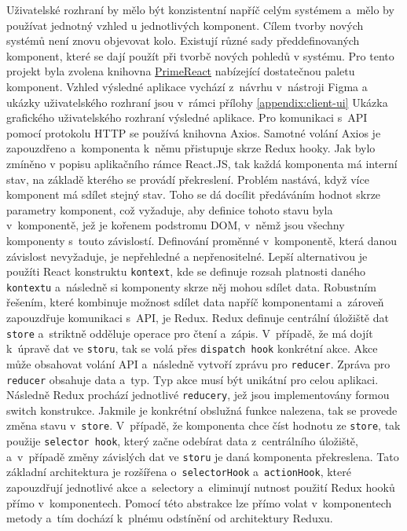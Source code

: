 \newpara
Uživatelské rozhraní by mělo být konzistentní napříč celým systémem a~mělo by používat jednotný vzhled u jednotlivých komponent. Cílem tvorby nových systémů není znovu objevovat kolo. Existují různé sady předdefinovaných komponent, které se dají použít při tvorbě nových pohledů v systému. Pro tento projekt byla zvolena knihovna \href{https://primereact.org/}{PrimeReact} nabízející dostatečnou paletu komponent. Vzhled výsledné aplikace vychází z~návrhu v~nástroji Figma a ukázky uživatelského rozhraní jsou v~rámci přílohy \ref{appendix:client-ui} Ukázka grafického uživatelského rozhraní výsledné aplikace.
\newpara
Pro komunikaci s~API pomocí protokolu HTTP se používá knihovna Axios. Samotné volání Axios je zapouzdřeno a~komponenta k~němu přistupuje skrze Redux hooky. Jak bylo zmíněno v popisu aplikačního rámce React.JS, tak každá komponenta má interní stav, na základě kterého se provádí překreslení. Problém nastává, když více komponent má sdílet stejný stav. Toho se dá docílit předáváním hodnot skrze parametry komponent, což vyžaduje, aby definice tohoto stavu byla v~komponentě, jež je kořenem podstromu DOM, v~němž jsou všechny komponenty s~touto závislostí. Definování proměnné v~komponentě, která danou závislost nevyžaduje, je nepřehledné a nepřenositelné. Lepší alternativou je použíti React konstruktu \texttt{kontext}, kde se definuje rozsah platnosti daného \texttt{kontextu} a~následně si komponenty skrze něj mohou sdílet data. Robustním řešením, které kombinuje možnost sdílet data napříč komponentami a~zároveň zapouzdřuje komunikaci s~API, je Redux. Redux definuje centrální úložiště dat \texttt{store} a~striktně odděluje operace pro čtení a~zápis. V~případě, že má dojít k~úpravě dat ve \texttt{storu}, tak se volá přes \texttt{dispatch hook} konkrétní akce. Akce může obsahovat volání API a~následně vytvoří zprávu pro \texttt{reducer}. Zpráva pro \texttt{reducer} obsahuje data a~typ. Typ akce musí být unikátní pro celou aplikaci. Následně Redux prochází jednotlivé \texttt{reducery}, jež jsou implementovány formou switch konstrukce. Jakmile je konkrétní obslužná funkce nalezena, tak se provede změna stavu v~\texttt{store}. V~případě, že komponenta chce číst hodnotu ze \texttt{store}, tak použije \texttt{selector hook}, který začne odebírat data z~centrálního úložiště, a~v~případě změny závislých dat ve \texttt{storu} je daná komponenta překreslena. Tato základní architektura je rozšířena o~\texttt{selectorHook} a~\texttt{actionHook}, které zapouzdřují jednotlivé akce a~selectory a~eliminují nutnost použití Redux hooků přímo v~komponentech. Pomocí této abstrakce lze přímo volat v~komponentech metody a~tím dochází k~plnému odstínění od architektury Reduxu.

